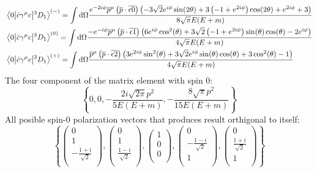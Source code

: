 \documentclass{article}
\newcommand{\gm}{\gamma^{\mu}}
\begin{document}
\begin{align*}
&\mel{0}{\bar c\gm c}{^3D_1}^{(-)}=\int\dd\Omega\frac{e^{-2 i \phi } \overline{p}^{\mu } \left(\overline{p}\cdot
   \overline{\text{$\epsilon $0}}\right) \left(-3 \sqrt{2} e^{i \phi } \sin (2 \theta
   )+3 \left(-1+e^{2 i \phi }\right) \cos (2 \theta )+e^{2 i \phi }+3\right)}{8
   \sqrt{\pi } E (E+m)}\\
&\mel{0}{\bar c\gm c}{^3D_1}^{(0)}=\int\dd\Omega \frac{-e^{-i \phi } \overline{p}^{\mu } \left(\overline{p}\cdot
   \overline{\text{$\epsilon $1}}\right) \left(6 e^{i \phi } \cos ^2(\theta )+3
   \sqrt{2} \left(-1+e^{2 i \phi }\right) \sin (\theta ) \cos (\theta )-2 e^{i \phi
   }\right)}{4 \sqrt{\pi } E (E+m)}\\
&\mel{0}{\bar c\gm c}{^3D_1}^{(+)}=\int\dd\Omega\frac{\overline{p}^{\mu } \left(\overline{p}\cdot \overline{\text{$\epsilon
   $2}}\right) \left(3 e^{2 i \phi } \sin ^2(\theta )+3 \sqrt{2} e^{i \phi } \sin
   (\theta ) \cos (\theta )+3 \cos ^2(\theta )-1\right)}{4 \sqrt{\pi } E (E+m)}
\end{align*}
The four component of the matrix element with spin 0:
   $$\left\{0,0,-\frac{2 i \sqrt{2 \pi } p^2}{5 E (E+m)},-\frac{8 \sqrt{\pi } p^2}{15 E (E+m)}\right\}$$
All posible spin-0 polarization vectors that produces result orthigonal to itself: 
$$\left\{\left(
\begin{array}{c}
 0 \\
 1 \\
 -\frac{1+i}{\sqrt{2}} \\
\end{array}
\right),\left(
\begin{array}{c}
 0 \\
 1 \\
 \frac{1-i}{\sqrt{2}} \\
\end{array}
\right),\left(
\begin{array}{c}
 1 \\
 0 \\
 0 \\
\end{array}
\right),\left(
\begin{array}{c}
 0 \\
 -\frac{1-i}{\sqrt{2}} \\
 1 \\
\end{array}
\right),\left(
\begin{array}{c}
 0 \\
 \frac{1+i}{\sqrt{2}} \\
 1 \\
\end{array}
\right)\right\}$$
\end{document}
